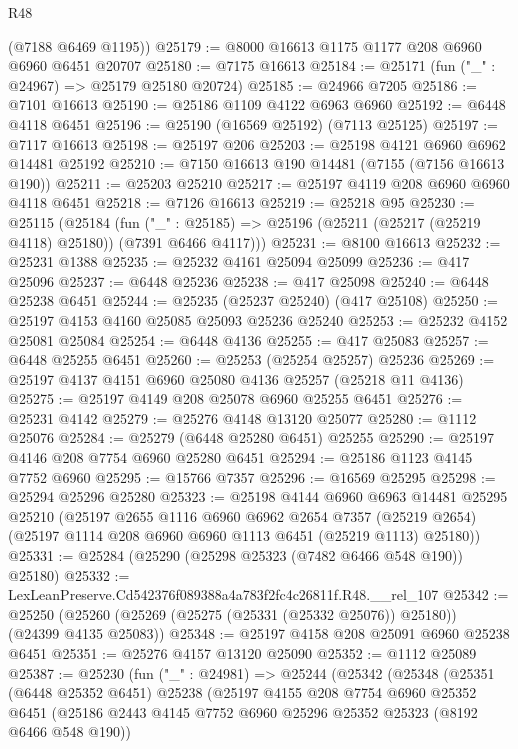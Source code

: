 \begin{lexlean}{R48}
\begin{coremodule}
      (@7188 @6469 @1195))
@25179 := @8000 @16613 @1175 @1177 @208 @6960 @6960 @6451 @20707
@25180 := @7175 @16613
@25184 := @25171 (fun ("_" : @24967) => @25179 @25180 @20724)
@25185 := @24966 @7205
@25186 := @7101 @16613
@25190 := @25186 @1109 @4122 @6963 @6960
@25192 := @6448 @4118 @6451
@25196 := @25190 (@16569 @25192) (@7113 @25125)
@25197 := @7117 @16613
@25198 := @25197 @206
@25203 := @25198 @4121 @6960 @6962 @14481 @25192
@25210 := @7150 @16613 @190 @14481 (@7155 (@7156 @16613 @190))
@25211 := @25203 @25210
@25217 := @25197 @4119 @208 @6960 @6960 @4118 @6451
@25218 := @7126 @16613
@25219 := @25218 @95
@25230 := @25115
    (@25184
      (fun ("_" : @25185) => @25196 (@25211 (@25217 (@25219 @4118) @25180)) (@7391 @6466 @4117)))
@25231 := @8100 @16613
@25232 := @25231 @1388
@25235 := @25232 @4161 @25094 @25099
@25236 := @417 @25096
@25237 := @6448 @25236
@25238 := @417 @25098
@25240 := @6448 @25238 @6451
@25244 := @25235 (@25237 @25240) (@417 @25108)
@25250 := @25197 @4153 @4160 @25085 @25093 @25236 @25240
@25253 := @25232 @4152 @25081 @25084
@25254 := @6448 @4136
@25255 := @417 @25083
@25257 := @6448 @25255 @6451
@25260 := @25253 (@25254 @25257) @25236
@25269 := @25197 @4137 @4151 @6960 @25080 @4136 @25257 (@25218 @11 @4136)
@25275 := @25197 @4149 @208 @25078 @6960 @25255 @6451
@25276 := @25231 @4142
@25279 := @25276 @4148 @13120 @25077
@25280 := @1112 @25076
@25284 := @25279 (@6448 @25280 @6451) @25255
@25290 := @25197 @4146 @208 @7754 @6960 @25280 @6451
@25294 := @25186 @1123 @4145 @7752 @6960
@25295 := @15766 @7357
@25296 := @16569 @25295
@25298 := @25294 @25296 @25280
@25323 := @25198
    @4144
    @6960
    @6963
    @14481
    @25295
    @25210
    (@25197
      @2655
      @1116
      @6960
      @6962
      @2654
      @7357
      (@25219 @2654)
      (@25197 @1114 @208 @6960 @6960 @1113 @6451 (@25219 @1113) @25180))
@25331 := @25284 (@25290 (@25298 @25323 (@7482 @6466 @548 @190)) @25180)
@25332 := LexLeanPreserve.Cd542376f089388a4a783f2fc4c26811f.R48.__rel_107
@25342 := @25250 (@25260 (@25269 (@25275 (@25331 (@25332 @25076)) @25180)) (@24399 @4135 @25083))
@25348 := @25197 @4158 @208 @25091 @6960 @25238 @6451
@25351 := @25276 @4157 @13120 @25090
@25352 := @1112 @25089
@25387 := @25230
    (fun ("_" : @24981) =>
    @25244
      (@25342
        (@25348
          (@25351
            (@6448 @25352 @6451)
            @25238
            (@25197
              @4155
              @208
              @7754
              @6960
              @25352
              @6451
              (@25186 @2443 @4145 @7752 @6960 @25296 @25352 @25323 (@8192 @6466 @548 @190))

\end{coremodule}
\end{lexlean}
